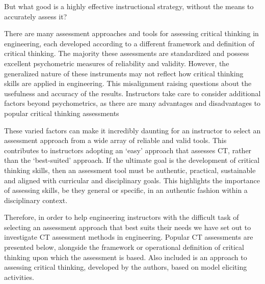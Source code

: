 But what good is a highly effective instructional strategy, without the means to accurately assess it?

There are many assessment approaches and tools for assessing critical thinking in engineering, each developed according to a different framework and definition of critical thinking.  The majority these assessments are standardized and possess excellent psychometric measures of reliability and validity.  However, the generalized nature of these instruments may not reflect how critical thinking skills are applied in engineering.  This misalignment raising questions about the usefulness and accuracy of the results.  Instructors take care to consider additional factors beyond psychometrics, as there are many advantages and disadvantages to popular critical thinking assessments\cite{Ku_2009}

These varied factors can make it incredibly daunting for an instructor to select an assessment approach from a wide array of reliable and valid tools.  This contributes to instructors adopting an ‘easy’ approach that assesses CT, rather than the ‘best-suited’ approach.  If the ultimate goal is the development of critical thinking skills, then an assessment tool must be authentic, practical, sustainable and aligned with curricular and disciplinary goals.  This highlights the importance of assessing skills, be they general or specific, in an authentic fashion within a disciplinary context.

Therefore, in order to help engineering instructors with the difficult task of selecting an assessment approach that best suits their needs we have set out to investigate CT assessment methods in engineering.  Popular CT assessments are presented below, alongside the framework or operational definition of critical thinking upon which the assessment is based.  Also included is an approach to assessing critical thinking, developed by the authors, based on model eliciting activities\cite{DiefesDux:2004fq, Kaupp:2014un}. 

